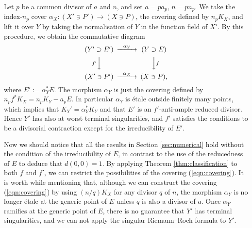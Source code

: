\documentclass[a4paper,11pt]{amsart}
\theoremstyle{definition}
\theoremstyle{remark}
\numberwithin{equation}{section}
\begin{document}
Let $p$ be a common divisor of $a$ and $n$,
and set $a=pa_p$, $n=pn_p$.
We take the index-$n_p$ cover $\alpha_X \colon (X' \ni P') \to (X \ni P)$,
the covering defined by $n_pK_X$,
and lift it over $Y$ by taking the normalisation of $Y$
in the function field of $X'$.
By this procedure,
we obtain the commutative diagram
\begin{align}\label{eqn:covering}
\begin{CD}
(Y' \supset E') @>\alpha_Y>> (Y \supset E) \\
@Vf'VV                       @VVfV \\
(X' \ni P')     @>\alpha_X>> (X \ni P),
\end{CD}
\end{align}
where $E':=\alpha_Y^*E$.
The morphism $\alpha_Y$ is just the covering
defined by $n_pf^*K_X=n_pK_Y-a_pE$.
In particular $\alpha_Y$ is \'etale outside finitely many points,
which implies that $K_Y'=\alpha_Y^*K_Y$ and
that $E'$ is an $f'$-anti-ample reduced divisor.
Hence $Y'$ has also at worst terminal singularities,
and $f'$ satisfies the conditions to be a divisorial contraction
except for the irreducibility of $E'$.

Now we should notice that all the results in Section \ref{sec:numerical} hold
without the condition of the irreducibility of $E$,
in contrast to the use of the reducedness of $E$ to deduce that $d(0,0)=1$.
By applying Theorem \ref{thm:classification} to both $f$ and $f'$,
we can restrict the possibilities of the covering (\ref{eqn:covering}).
It is worth while mentioning that,
although we can construct the covering (\ref{eqn:covering})
by using $(n/q)K_X$ for any divisor $q$ of $n$,
the morphism $\alpha_Y$ is no longer \'etale
at the generic point of $E$ unless $q$ is also a divisor of $a$.
Once $\alpha_Y$ ramifies at the generic point of $E$,
there is no guarantee that $Y'$ has terminal singularities,
and we can not apply the singular Riemann--Roch formula to $Y'$.
\end{document}
